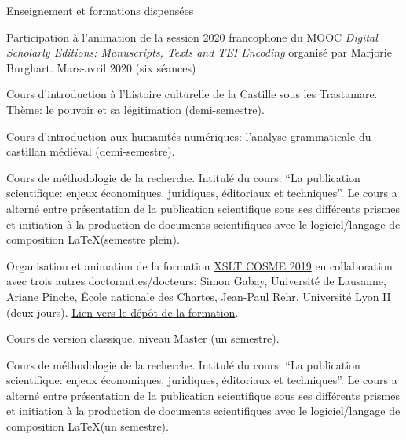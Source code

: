 \begin{rubric}{Enseignement et formations dispensées}
                                \entry*[2019-2020]
                                
                            Participation à l'animation de la session 2020 francophone du MOOC
                            \textit{Digital Scholarly Editions: Manuscripts, Texts and TEI Encoding}
                        organisé par Marjorie Burghart. Mars-avril 2020 (six séances)
                    
                                \entry*
                            Cours d'introduction à l'histoire culturelle de la Castille sous les
                        Trastamare. Thème: le pouvoir et sa légitimation (demi-semestre).
                    
                                \entry*
                            Cours d'introduction aux humanités numériques: l'analyse grammaticale du
                        castillan médiéval (demi-semestre).
                    
                                \entry*
                            Cours de méthodologie de la recherche. Intitulé du cours: \enquote{La
                            publication scientifique: enjeux économiques, juridiques, éditoriaux et
                            techniques}. Le cours a alterné entre présentation de la publication
                        scientifique sous ses différents prismes et initiation à la production de
                        documents scientifiques avec le logiciel/langage de composition \LaTeX (semestre
                        plein).
                    
                                \entry*[2018-2019]
                                
                            Organisation et animation de la formation \href{https://cosme.hypotheses.org/1117}{XSLT COSME 2019} en
                        collaboration avec trois autres doctorant.es/docteurs: Simon Gabay, Université de
                        Lausanne, Ariane Pinche, École nationale des Chartes, Jean-Paul Rehr, Université
                        Lyon II (deux jours). \href{https://github.com/gabays/Cours\_COSME\_2019}{Lien vers le dépôt de la formation}.
                    
                                \entry*
                            Cours de version classique, niveau Master (un semestre).
                    
                                \entry*
                            Cours de méthodologie de la recherche. Intitulé du cours: \enquote{La
                            publication scientifique: enjeux économiques, juridiques, éditoriaux et
                            techniques}. Le cours a alterné entre présentation de la publication
                        scientifique sous ses différents prismes et initiation à la production de
                        documents scientifiques avec le logiciel/langage de composition \LaTeX (un
                        semestre).
                    

\end{rubric}
